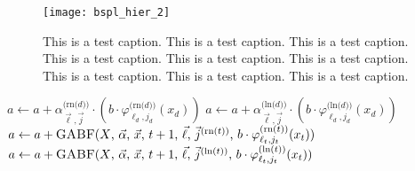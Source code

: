 \begin{figure}
  \texttt{[image: bspl\_hier\_2]}
  \caption{%
    This is a test caption.
    This is a test caption.
    This is a test caption.
    This is a test caption.
    This is a test caption.
    This is a test caption.
    This is a test caption.
    This is a test caption.
    This is a test caption.%
  }
  \label{fig:test2}
\end{figure}

\begin{algorithm}
  \begin{algorithmic}[1]
    \Statex{}
    \EndIf\vspace{-0.25em}
    \color{green}
    $a \gets a + \alpha_{\vec{\ell},\vec{j}}^{\text{(rn($d$))}} \cdot
    (b \cdot \varphi_{\ell_d,j_d}^{\text{(rn($d$))}}(x_d))$
    \EndIf
    \label{line:getaffected1}
    $a \gets a + \alpha_{\vec{\ell},\vec{j}}^{\text{(ln($d$))}} \cdot
    (b \cdot \varphi_{\ell_d,j_d}^{\text{(ln($d$))}}(x_d))$
    \EndIf\vspace{-0.4em}
    \label{line:getaffected2}
    \color{black}
    \Else
    \label{line:getaffected5}
    \color{green}
    $a \gets a + \text{\Call{GABF}{$X$, $\vec{\alpha}$, $\vec{x}$, $t+1$,
        $\vec{\ell}$, $\vec{j}^{\text{(rn($t$))}}$,
        $b \cdot \varphi_{\ell_t,j_t}^{\text{(rn($t$))}}(x_t)$}}$
    \EndIf
    \label{line:getaffected3}
    $a \gets a + \text{\Call{GABF}{$X$, $\vec{\alpha}$, $\vec{x}$, $t+1$,
        $\vec{\ell}$, $\vec{j}^{\text{(ln($t$))}}$,
        $b \cdot \varphi_{\ell_t,j_t}^{\text{(ln($t$))}}(x_t)$}}$

\end{algorithmic}
\end{algorithm}
